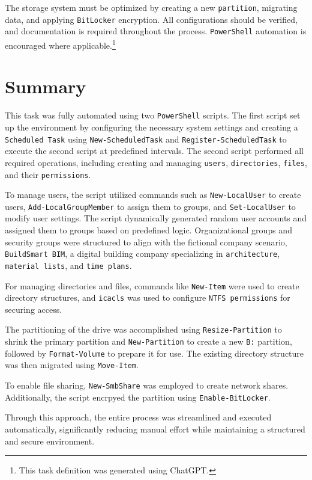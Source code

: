 \documentclass[a4paper]{article}
\begin{document}
The storage system must be optimized by creating a new \texttt{partition}, migrating data, and applying \texttt{BitLocker} encryption. All configurations should be verified, and documentation is required throughout the process. \texttt{PowerShell} automation is encouraged where applicable.\footnote{This task definition was generated using ChatGPT.}

\section{Summary}
This task was fully automated using two \texttt{PowerShell} scripts. The first script set up the environment by configuring the necessary system settings and creating a \texttt{Scheduled Task} using \texttt{New-ScheduledTask} and \texttt{Register-ScheduledTask} to execute the second script at predefined intervals. The second script performed all required operations, including creating and managing \texttt{users}, \texttt{directories}, \texttt{files}, and their \texttt{permissions}.

To manage users, the script utilized commands such as \texttt{New-LocalUser} to create users, \texttt{Add-LocalGroupMember} to assign them to groups, and \texttt{Set-LocalUser} to modify user settings. The script dynamically generated random user accounts and assigned them to groups based on predefined logic. Organizational groups and security groups were structured to align with the fictional company scenario, \texttt{BuildSmart BIM}, a digital building company specializing in \texttt{architecture}, \texttt{material lists}, and \texttt{time plans}.

For managing directories and files, commands like \texttt{New-Item} were used to create directory structures, and \texttt{icacls} was used to configure \texttt{NTFS permissions} for securing access.

The partitioning of the drive was accomplished using \texttt{Resize-Partition} to shrink the primary partition and \texttt{New-Partition} to create a new \texttt{B:} partition, followed by \texttt{Format-Volume} to prepare it for use. The existing directory structure was then migrated using \texttt{Move-Item}.

To enable file sharing, \texttt{New-SmbShare} was employed to create network shares. Additionally, the script encrpyed the partition using \texttt{Enable-BitLocker}.

Through this approach, the entire process was streamlined and executed automatically, significantly reducing manual effort while maintaining a structured and secure environment.
\end{document}
